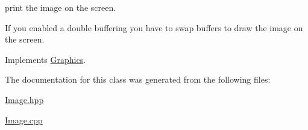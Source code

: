 print the image on the screen. 

If you enabled a double buffering you have to swap buffers to draw the image on the screen. 

Implements \hyperlink{class_graphics_a144fcecfe73dd5957c081dad42e1c11d}{Graphics}.



The documentation for this class was generated from the following files\+:\begin{DoxyCompactItemize}
\item 
\hyperlink{_image_8hpp}{Image.\+hpp}\item 
\hyperlink{_image_8cpp}{Image.\+cpp}\end{DoxyCompactItemize}

